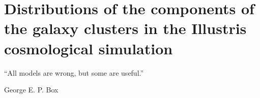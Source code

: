 
\setcounter{chapter}{2}
\chapter{Distributions of the components of the galaxy clusters in the
Illustris cosmological simulation}{}{}
\label{chapter3}
\epigraph{``All models are wrong, but some are useful.''}{George E. P. Box} 

